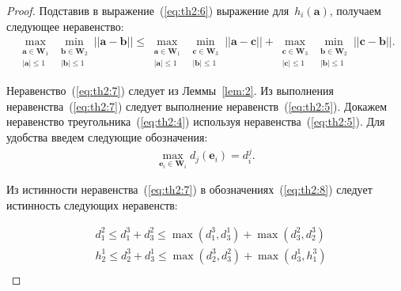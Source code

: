 \documentclass[12pt, twoside]{article}
\numberwithin{equation}{section}
\begin{document}
\begin{proof}
Подставив в выражение~(\ref{eq:th2:6}) выражение для~$h_i\left(\textbf{a}\right)$, получаем следующее неравенство:
\begin{equation}
\label{eq:th2:7}
\begin{aligned}
\max_{\substack{\textbf{a} \in \textbf{W}_1 \\ \left|\textbf{a}\right| \leq 1}} \min_{\substack{\textbf{b} \in \textbf{W}_2 \\ \left|\textbf{b}\right| \leq 1}}||\textbf{a} - \textbf{b}|| \leq 
\max_{\substack{\textbf{a} \in \textbf{W}_1 \\ \left|\textbf{a}\right| \leq 1}} \min_{\substack{\textbf{c} \in \textbf{W}_3 \\ \left|\textbf{b}\right| \leq 1}}||\textbf{a} - \textbf{c}||+
\max_{\substack{\textbf{c} \in \textbf{W}_3 \\ \left|\textbf{c}\right| \leq 1}} \min_{\substack{\textbf{b} \in \textbf{W}_2 \\ \left|\textbf{b}\right| \leq 1}}||\textbf{c} - \textbf{b}||.
\end{aligned}
\end{equation}

Неравенство~(\ref{eq:th2:7}) следует из Леммы~\ref{lem:2}. Из выполнения неравенства~(\ref{eq:th2:7}) следует выполнение неравенств~(\ref{eq:th2:5}).
Докажем неравенство треугольника~(\ref{eq:th2:4}) используя неравенства~(\ref{eq:th2:5}). Для удобства введем следующие обозначения:
\begin{equation}
\label{eq:th2:8}
\begin{aligned}
\max_{\textbf{e}_i \in \textbf{W}_i} d_j\left(\textbf{e}_i\right) = d_{i}^{j}.
\end{aligned}
\end{equation}

Из истинности неравенства~(\ref{eq:th2:7}) в обозначениях~(\ref{eq:th2:8}) следует истинность следующих неравенств:
 
\begin{equation}
\label{eq:th2:9}
\begin{aligned}
\quad d_{1}^{2} \leq d_{1}^{3} + d_{3}^{2} \leq \max\left(d_{1}^{3}, d_{3}^{1}\right) + \max\left(d_{3}^{2}, d_{2}^{3}\right)\\
\quad h_{2}^{1} \leq d_{2}^{3} + d_{3}^{1} \leq \max\left(d_{2}^{3}, d_{3}^{2}\right) + \max\left(d_{3}^{1}, h_{1}^{3}\right)\\
\end{aligned}
\end{equation}


\end{proof}
\end{document}
